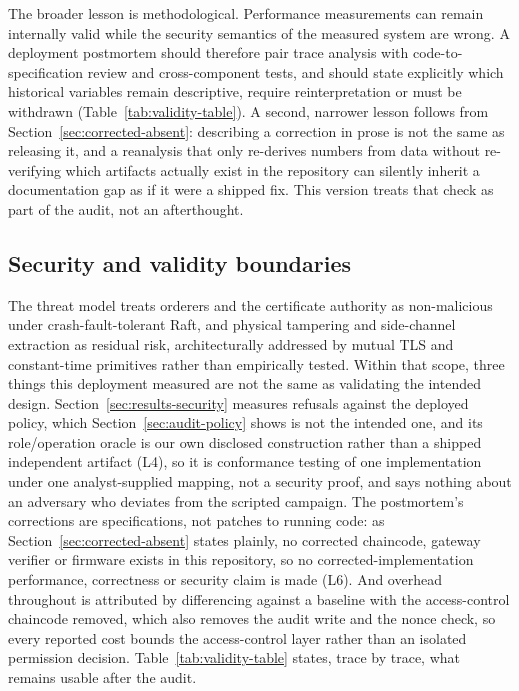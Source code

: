 The broader lesson is methodological. Performance measurements can remain internally valid while the security semantics of the measured system are wrong. A deployment postmortem should therefore pair trace analysis with code-to-specification review and cross-component tests, and should state explicitly which historical variables remain descriptive, require reinterpretation or must be withdrawn (Table~\ref{tab:validity-table}). A second, narrower lesson follows from Section~\ref{sec:corrected-absent}: describing a correction in prose is not the same as releasing it, and a reanalysis that only re-derives numbers from data without re-verifying which artifacts actually exist in the repository can silently inherit a documentation gap as if it were a shipped fix. This version treats that check as part of the audit, not an afterthought.

\subsection{Security and validity boundaries}

The threat model treats orderers and the certificate authority as non-malicious under crash-fault-tolerant Raft, and physical tampering and side-channel extraction as residual risk, architecturally addressed by mutual TLS and constant-time primitives rather than empirically tested. Within that scope, three things this deployment measured are not the same as validating the intended design. Section~\ref{sec:results-security} measures refusals against the deployed policy, which Section~\ref{sec:audit-policy} shows is not the intended one, and its role/operation oracle is our own disclosed construction rather than a shipped independent artifact (L4), so it is conformance testing of one implementation under one analyst-supplied mapping, not a security proof, and says nothing about an adversary who deviates from the scripted campaign. The postmortem's corrections are specifications, not patches to running code: as Section~\ref{sec:corrected-absent} states plainly, no corrected chaincode, gateway verifier or firmware exists in this repository, so no corrected-implementation performance, correctness or security claim is made (L6). And overhead throughout is attributed by differencing against a baseline with the access-control chaincode removed, which also removes the audit write and the nonce check, so every reported cost bounds the access-control layer rather than an isolated permission decision. Table~\ref{tab:validity-table} states, trace by trace, what remains usable after the audit.

